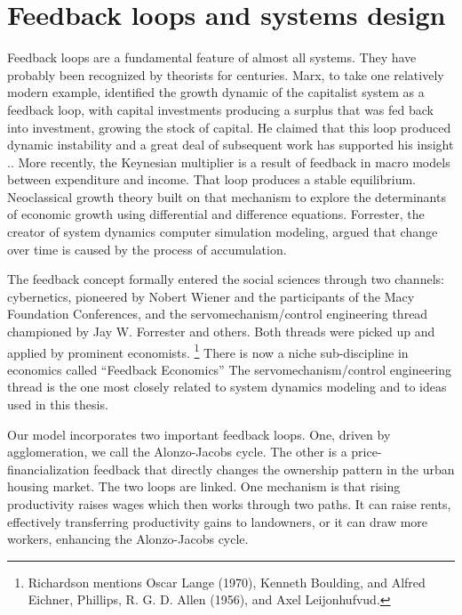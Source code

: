 \section{Feedback loops and systems design}


Feedback loops are a fundamental feature of almost all systems. They have probably been recognized by theorists for centuries. Marx, to take one relatively modern example, identified the growth dynamic of the capitalist system  as a feedback loop, with capital investments producing a surplus that was fed back into investment, growing the stock of capital. He  claimed that this loop produced dynamic instability and a great deal of subsequent work has supported his insight \cite{dumenilStabilityInstabilityDynamic1986}.\cite{schumpeterInstabilityCapitalism1928}. More recently, the Keynesian multiplier is a result of feedback in macro models between expenditure and income. That loop produces a stable equilibrium. Neoclassical growth theory built on that mechanism to explore the determinants of economic growth using differential and difference equations. Forrester, the creator of system dynamics computer simulation modeling, argued that change over time is caused by the process of accumulation.

The feedback concept formally entered the social sciences through two channels: cybernetics, pioneered by Nobert Wiener  and the participants of the Macy Foundation Conferences, and the servomechanism/control engineering thread championed by Jay W. Forrester and others. Both threads were picked up and applied by prominent economists. \footnote{Richardson \cite{richardsonFeedbackThoughtSocial1991} mentions Oscar Lange (1970), Kenneth Boulding, and Alfred Eichner, Phillips,  R. G. D. Allen (1956), and Axel Leijonhufvud.} There is now a niche sub-discipline in economics called ``Feedback Economics'' \cite{radzickiIntroductionFeedbackEconomics, cavanaFeedbackEconomicsEconomic2021}  The servomechanism/control engineering thread is the one most closely related to \gls{system dynamics} modeling and to ideas used in this thesis.

Our model incorporates two important feedback loops. One, driven by agglomeration, we call the \Gls{Alonzo-Jacobs cycle}. The other is a price-financialization feedback that directly changes the ownership pattern in the urban housing market. The two loops are linked. One mechanism is that rising productivity raises wages which then works through two paths. It can raise rents, effectively transferring productivity gains to landowners, or it can draw more workers, enhancing the \Gls{Alonzo-Jacobs cycle}. 

